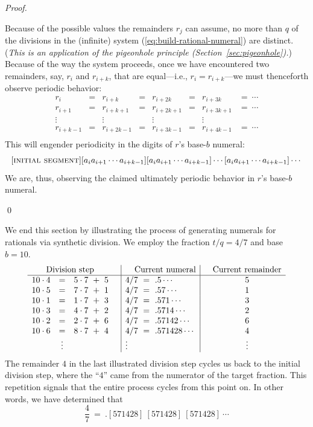\begin{proof}
\begin{enumerate}
Because of the possible values the remainders $r_j$ can assume, no
more than $q$ of the divisions in the (infinite) system
(\ref{eq:build-rational-numeral}) are distinct.  ({\em This is an
  application of the pigeonhole principle
  (Section~\ref{sec:pigeonhole}).})  Because of the way the system
proceeds, once we have encountered two remainders, say, $r_i$ and
$r_{i+k}$, that are equal---i.e., $r_i = r_{i+k}$---we must
thenceforth observe periodic behavior:
\[
\begin{array}{cccccccc}
r_i       & = & r_{i+k}    & = & r_{i+2k}   & = & r_{i+3k}   & = \ \cdots \\
r_{i+1}   & = & r_{i+k+1}  & = & r_{i+2k+1} & = & r_{i+3k+1} & = \ \cdots \\
\vdots    &   & \vdots     &   & \vdots     &   & \vdots     & \\
r_{i+k-1} & = & r_{i+2k-1} & = & r_{i+3k-1} & = & r_{i+4k-1} & = \ \cdots \\
\end{array}
\]
This will engender periodicity in the digits of $r$'s base-$b$ numeral:
\[ [\mbox{\sc initial segment}]
 [a_i a_{i+1} \cdots a_{i+k-1}]
          [a_i a_{i+1} \cdots a_{i+k-1}]
    \cdots  [a_i a_{i+1} \cdots a_{i+k-1}] \cdots 
\]
We are, thus, observing the claimed ultimately periodic behavior in
$r$'s base-$b$ numeral.
\end{enumerate}
\qed
\end{proof}

\bigskip

We end this section by illustrating the process of generating numerals
for rationals via synthetic division.  We employ the fraction $t/q = 4/7$
and base $b = 10$.
\[
\begin{array}{lclc|l|cc}
\multicolumn{3}{c}{\mbox{Division step}} & &  \hspace*{.15in} \mbox{Current numeral} & &
\mbox{Current remainder} \\
\hline
10 \cdot 4   & = & 5 \cdot 7 \ + \ 5 &
      & 4/7 \ = \ .5 \cdots &
      & 5 \\
10 \cdot 5 & = & 7 \cdot 7 \ + \ 1 &
      & 4/7 \ = \ .57 \cdots &
      & 1 \\
10 \cdot 1 & = & 1 \cdot 7 \ + \ 3 &
      & 4/7 \ = \ .571 \cdots &
      & 3 \\
10 \cdot 3 & = & 4 \cdot 7 \ + \ 2 &
      & 4/7 \ = \ .5714 \cdots &
      & 2 \\
10 \cdot 2 & = & 2 \cdot 7 \ + \ 6 &
      & 4/7 \ = \ .57142 \cdots &
      & 6 \\
10 \cdot 6 & = & 8 \cdot 7 \ + \ 4 &
      & 4/7 \ = \ .571428 \cdots &
      & 4 \\
 & \vdots & & & \vdots & & \vdots
\end{array}
\]
The remainder $4$ in the last illustrated division step cycles us back
to the initial division step, where the ``$4$'' came from the
numerator of the target fraction.  This repetition signals that the
entire process cycles from this point on.  In other words, we have
determined that
\[ \frac{4}{7} \ = \ .[571428] \ [571428] \ [571428] \ \cdots \]

